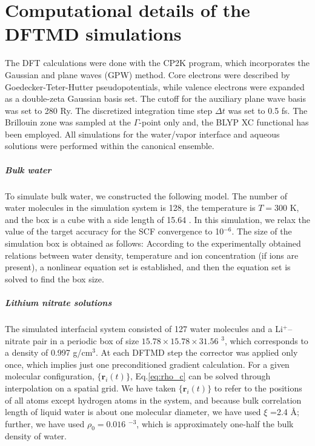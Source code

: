 \chapter{Computational details of the DFTMD simulations}\label{computational_detail}
The DFT calculations were done with the CP2K program\cite{CP2K,Kuehne2020}, which incorporates the Gaussian and plane waves (GPW) method\cite{Lippert1999}. 
Core electrons were described by Goedecker-Teter-Hutter pseudopotentials\cite{Goedecker1996,MK05}, while valence electrons were expanded as a double-zeta Gaussian basis set\cite{VandeVondele2007}. 
The cutoff for the auxiliary plane wave basis was set to 280 Ry.
The discretized integration time step $\Delta t$ was set to 0.5 fs. 
The Brillouin zone was sampled at the $\Gamma$-point only and, the BLYP XC functional has been employed.
All simulations for the water/vapor interface and aqueous solutions were performed within the canonical ensemble. 
%
\paragraph{Bulk water}\label{DETAILS_NEAT_WATER}
To simulate bulk water, we constructed the following model. 
The number of water molecules in the simulation system is 128, 
the temperature is $T=300$ K, and the box is a cube with a side length of 15.64 \A. 
In this simulation, we relax the value of the target accuracy for the SCF convergence to 10$^{-6}$. 
The size of the simulation box is obtained as follows: 
According to the experimentally obtained relations between water density, temperature and ion concentration (if ions are present), 
a nonlinear equation set is established, and then the equation set is solved to find the box size.

\paragraph{Lithium nitrate solutions}\label{DETAILS_LINO3}
The simulated interfacial system consisted of 127 water molecules and a Li$^+$--nitrate pair in a periodic
box of size $15.78 \times 15.78 \times 31.56$ \A$^3$, which corresponds to
a density of 0.997 g/cm$^3$. 
At each DFTMD step the corrector was applied only once, which implies just one preconditioned gradient calculation. 
For a given molecular configuration, $\{\mathbf{r}_i (t)\}$, Eq.\thinspace\ref{eq:rho_c} can be
solved through interpolation on a spatial grid\cite{Willard2010}. 
We have taken $\{\mathbf{r}_i (t)\}$ to refer to the positions of all
atoms except hydrogen atoms in the system, and because bulk correlation length of
liquid water is about one molecular diameter, we have used $\xi$ 
=2.4 \AA; further, we have used $\rho_0= 0.016$ \A$^{-3}$, which is
approximately one-half the bulk density of water. 

